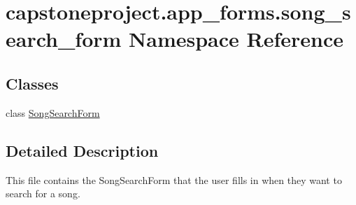 \hypertarget{namespacecapstoneproject_1_1app__forms_1_1song__search__form}{}\section{capstoneproject.\+app\+\_\+forms.\+song\+\_\+search\+\_\+form Namespace Reference}
\label{namespacecapstoneproject_1_1app__forms_1_1song__search__form}
\subsection*{Classes}
\begin{DoxyCompactItemize}
\item 
class \mbox{\hyperlink{classcapstoneproject_1_1app__forms_1_1song__search__form_1_1_song_search_form}{Song\+Search\+Form}}
\end{DoxyCompactItemize}


\subsection{Detailed Description}
\begin{DoxyVerb}This file contains the SongSearchForm that the user fills in when they want to search for a song.
\end{DoxyVerb}
 